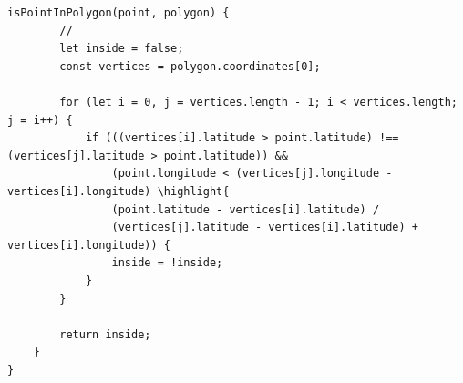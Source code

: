 \begin{lstlisting}[style=javascript]
    isPointInPolygon(point, polygon) {
        // 
        let inside = false;
        const vertices = polygon.coordinates[0];
        
        for (let i = 0, j = vertices.length - 1; i < vertices.length; j = i++) {
            if (((vertices[i].latitude > point.latitude) !== (vertices[j].latitude > point.latitude)) &&
                (point.longitude < (vertices[j].longitude - vertices[i].longitude) \highlight{ 
                (point.latitude - vertices[i].latitude) / 
                (vertices[j].latitude - vertices[i].latitude) + vertices[i].longitude)) {
                inside = !inside;
            }
        }
        
        return inside;
    }
}
\end{lstlisting}

\hypertarget{section-168}{%
\subsubsection{}\label{section-168}}

